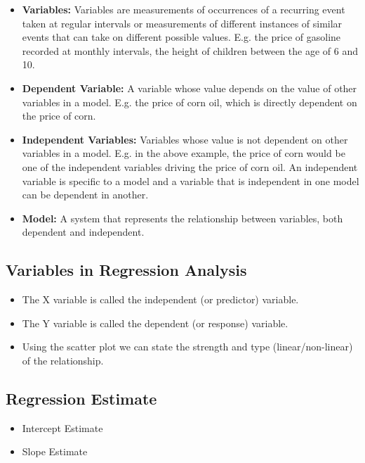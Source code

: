 \documentclass[]{report}
\begin{document}
	
	\begin{itemize}
		\item \textbf{Variables:} Variables are measurements of occurrences of a recurring event taken at regular intervals or measurements of different instances of similar events that can take on different possible values. E.g. the price of gasoline recorded at monthly intervals, the height of children between the age of 6 and 10.
		\smallskip
		\item \textbf{Dependent Variable:} A variable whose value depends on the value of other variables in a model. E.g. the price of corn oil, which is directly dependent on the price of corn.
		\smallskip
		\item \textbf{Independent Variables:} Variables whose value is not dependent on other variables in a model. E.g. in the above example, the price of corn would be one of the independent variables driving the price of corn oil. An independent variable is specific to a model and a variable that is independent in one model can be dependent in another.
		\smallskip
		\item \textbf{Model:}
		A system that represents the relationship between variables, both dependent and independent.
	\end{itemize}

\subsection{Variables in Regression Analysis }
\begin{itemize}
	\item The X variable is called the independent (or predictor) variable.
	\item The Y variable is called the dependent (or response) variable.
	\item Using the scatter plot we can state the strength and type
	(linear/non-linear) of the relationship.
\end{itemize}



\subsection{Regression Estimate}
\begin{itemize}
	\item Intercept Estimate
	\item Slope Estimate
\end{itemize}

\end{document}
